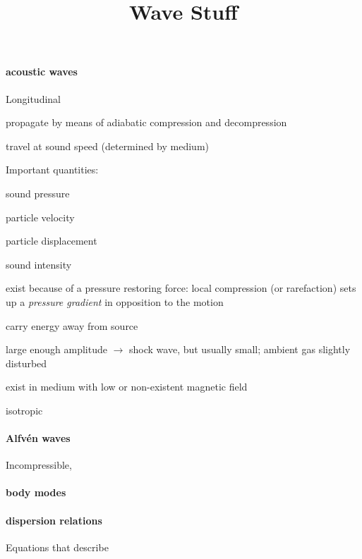 \documentclass[12pt]{article}
\title{\vspace{-0.5in}Wave Stuff}
\author{}
\date{}
\begin{document}
\maketitle

\vspace{-1in}

\paragraph{acoustic waves}
\begin{itemize*}
    \item Longitudinal
    \item propagate by means of adiabatic compression and decompression
    \item travel at sound speed (determined by medium)
    \item Important quantities:
        \begin{itemize*}
            \item sound pressure
            \item particle velocity
            \item particle displacement
            \item sound intensity
        \end{itemize*}
    \item exist because of a pressure restoring force: local compression
        (or rarefaction) sets up a \emph{pressure gradient} in opposition
        to the motion
    \item carry energy away from source
    \item large enough amplitude $\rightarrow$ shock wave,
        but usually small; ambient gas slightly disturbed
    \item exist in medium with low or non-existent magnetic field
    \item isotropic
\end{itemize*}

\paragraph{Alfv\'en waves}
Incompressible,

\paragraph{body modes}


\paragraph{dispersion relations}
Equations that describe
\end{document}
